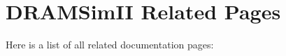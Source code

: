 \section{DRAMSimII Related Pages}
Here is a list of all related documentation pages:\begin{CompactList}
\item {}

\end{CompactList}
